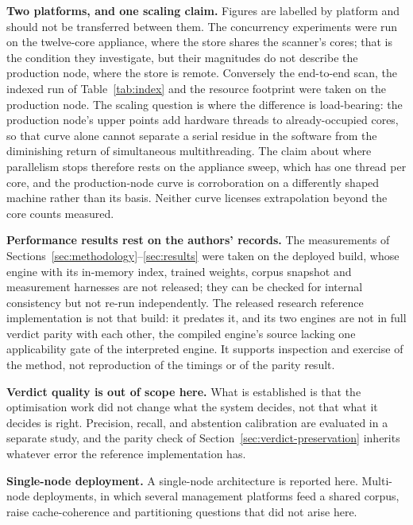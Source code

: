\documentclass[fleqn,10pt,lineno]{wlpeerj}
\begin{document}
\textbf{Two platforms, and one scaling claim.} Figures are labelled by platform and should not be transferred between them. The concurrency experiments were run on the twelve-core appliance, where the store shares the scanner's cores; that is the condition they investigate, but their magnitudes do not describe the production node, where the store is remote. Conversely the end-to-end scan, the indexed run of Table~\ref{tab:index} and the resource footprint were taken on the production node. The scaling question is where the difference is load-bearing: the production node's upper points add hardware threads to already-occupied cores, so that curve alone cannot separate a serial residue in the software from the diminishing return of simultaneous multithreading. The claim about where parallelism stops therefore rests on the appliance sweep, which has one thread per core, and the production-node curve is corroboration on a differently shaped machine rather than its basis. Neither curve licenses extrapolation beyond the core counts measured.

\textbf{Performance results rest on the authors' records.} The measurements of Sections~\ref{sec:methodology}--\ref{sec:results} were taken on the deployed build, whose engine with its in-memory index, trained weights, corpus snapshot and measurement harnesses are not released; they can be checked for internal consistency but not re-run independently. The released research reference implementation is not that build: it predates it, and its two engines are not in full verdict parity with each other, the compiled engine's source lacking one applicability gate of the interpreted engine. It supports inspection and exercise of the method, not reproduction of the timings or of the parity result.

\textbf{Verdict quality is out of scope here.} What is established is that the optimisation work did not change what the system decides, not that what it decides is right. Precision, recall, and abstention calibration are evaluated in a separate study, and the parity check of Section~\ref{sec:verdict-preservation} inherits whatever error the reference implementation has.

\textbf{Single-node deployment.} A single-node architecture is reported here. Multi-node deployments, in which several management platforms feed a shared corpus, raise cache-coherence and partitioning questions that did not arise here.
\end{document}
